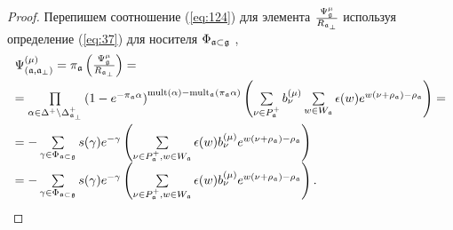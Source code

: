 \begin{proof}
Перепишем соотношение (\ref{eq:124}) для элемента $\frac{\Psi _{\mathfrak{g}}^{\mu }}{R_{\mathfrak{a}_{\perp}}}$ используя определение (\ref{eq:37})
для носителя $\Phi _{\mathfrak{a}\subset \mathfrak{g}}$ ,
\begin{equation*}
\begin{array}{l}
\Psi ^{\left( \mu \right) }_{\left(  \af, \afb \right)}
=\pi _{\af}\left( \frac{\Psi _{\gf}^{\mu }}{R_{\af_{\perp }}}%
\right) = \\[2mm]
=\prod\limits_{\alpha \in \Delta ^{+}\setminus \Delta _{\afb }^{+}}\left(
1-e^{-\pi _{\af}\alpha }\right) ^{\mathrm{mult}(\alpha )-\mathrm{mult}_{%
\af}(\pi _{\af}\alpha )}\left( \sum\limits_{\nu \in P_{\af%
}^{+}}b_{\nu }^{(\mu )}\sum\limits_{w\in W_{\af}}\epsilon (w)e^{w(\nu
+\rho _{\af})-\rho _{\af}}\right) = \\[5mm]
=-\sum\limits_{\gamma \in \Phi _{\af\subset \gf}}s(\gamma
)e^{-\gamma }\left( \sum\limits_{\nu \in P_{\af}^{+},w\in W_{\af%
}}\epsilon (w)b_{\nu }^{(\mu )}e^{w(\nu +\rho _{\af})-\rho _{\af%
}}\right)  \\
=-\sum\limits_{\gamma \in \Phi _{\af\subset \gf}}s(\gamma
)e^{-\gamma }\left( \sum\limits_{\nu \in P_{\af}^{+},w\in W_{\af%
}}\epsilon (w)b_{\nu }^{(\mu )}e^{w(\nu +\rho _{\af})-\rho _{\af%
}}\right) .
\end{array}
\end{equation*}


\end{proof}
